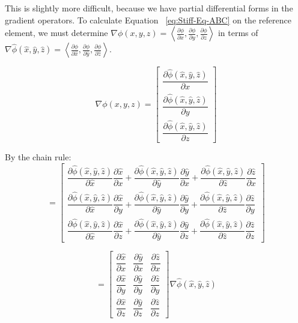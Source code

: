 This is slightly more difficult, because we have partial differential forms in the gradient operators. To calculate Equation ~\ref{eq:Stiff-Eq-ABC} on the reference element, we must determine $\nabla \phi(x,y,z) = \left<\frac{\partial \phi}{\partial x}, \frac{\partial \phi}{\partial y}, \frac{\partial \phi}{\partial z}\right>$ in terms of $\nabla \hat{\phi}(\hat{x}, \hat{y}, \hat{z}) = \left<\frac{\partial \phi}{\partial \hat{x}}, \frac{\partial \phi}{\partial \hat{y}}, \frac{\partial \phi}{\partial \hat{z}}\right>$.

\begin{equation}
\nabla \phi(x,y,z) = \begin{bmatrix}
\dfrac{\partial \hat{\phi}(\hat{x}, \hat{y}, \hat{z})}{\partial x} \\
\dfrac{\partial \hat{\phi}(\hat{x}, \hat{y}, \hat{z})}{\partial y} \\
\dfrac{\partial \hat{\phi}(\hat{x}, \hat{y}, \hat{z})}{\partial z}
\end{bmatrix}
\end{equation}

By the chain rule:
\begin{equation}
= \begin{bmatrix}
\dfrac{\partial \hat{\phi}(\hat{x}, \hat{y}, \hat{z})}{\partial \hat{x}} \dfrac{\partial \hat{x}}{\partial x} + \dfrac{\partial \hat{\phi}(\hat{x}, \hat{y}, \hat{z})}{\partial \hat{y}} \dfrac{\partial \hat{y}}{\partial x} + \dfrac{\partial \hat{\phi}(\hat{x}, \hat{y}, \hat{z})}{\partial \hat{z}} \dfrac{\partial \hat{z}}{\partial x} \\
\dfrac{\partial \hat{\phi}(\hat{x}, \hat{y}, \hat{z})}{\partial \hat{x}} \dfrac{\partial \hat{x}}{\partial y} + \dfrac{\partial \hat{\phi}(\hat{x}, \hat{y}, \hat{z})}{\partial \hat{y}} \dfrac{\partial \hat{y}}{\partial y} + \dfrac{\partial \hat{\phi}(\hat{x}, \hat{y}, \hat{z})}{\partial \hat{z}} \dfrac{\partial \hat{z}}{\partial y} \\
\dfrac{\partial \hat{\phi}(\hat{x}, \hat{y}, \hat{z})}{\partial \hat{x}} \dfrac{\partial \hat{x}}{\partial z} + \dfrac{\partial \hat{\phi}(\hat{x}, \hat{y}, \hat{z})}{\partial \hat{y}} \dfrac{\partial \hat{y}}{\partial z} + \dfrac{\partial \hat{\phi}(\hat{x}, \hat{y}, \hat{z})}{\partial \hat{z}} \dfrac{\partial \hat{z}}{\partial z}
\end{bmatrix} 
\end{equation}

\begin{equation}
= \begin{bmatrix}
\dfrac{\partial \hat{x}}{\partial x} & \dfrac{\partial \hat{y}}{\partial x} & \dfrac{\partial \hat{z}}{\partial x} \\
\dfrac{\partial \hat{x}}{\partial y} & \dfrac{\partial \hat{y}}{\partial y} & \dfrac{\partial \hat{z}}{\partial y} \\
\dfrac{\partial \hat{x}}{\partial z} & \dfrac{\partial \hat{y}}{\partial z} & \dfrac{\partial \hat{z}}{\partial z}
\end{bmatrix} \nabla \hat{\phi}(\hat{x}, \hat{y}, \hat{z})
\end{equation}





